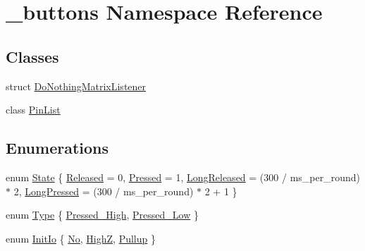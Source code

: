 \hypertarget{namespace__buttons}{}\section{\+\_\+buttons Namespace Reference}
\label{namespace__buttons}
\subsection*{Classes}
\begin{DoxyCompactItemize}
\item 
struct \hyperlink{struct__buttons_1_1DoNothingMatrixListener}{Do\+Nothing\+Matrix\+Listener}
\item 
class \hyperlink{class__buttons_1_1PinList}{Pin\+List}
\end{DoxyCompactItemize}
\subsection*{Enumerations}
\begin{DoxyCompactItemize}
\item 
enum \hyperlink{namespace__buttons_ae0bcacc9ee73b99889cf151d77ae2b8f}{State} \{ \newline
\hyperlink{namespace__buttons_ae0bcacc9ee73b99889cf151d77ae2b8faed054b3f25a72e25e4e57b728e7e945e}{Released} = 0, 
\newline
\hyperlink{namespace__buttons_ae0bcacc9ee73b99889cf151d77ae2b8fa8b62633a3dd6e8d1f8f2826500ca4246}{Pressed} = 1, 
\newline
\hyperlink{namespace__buttons_ae0bcacc9ee73b99889cf151d77ae2b8fa54cc1d73806cf15b92264c885ee0c058}{Long\+Released} = (300 / ms\+\_\+per\+\_\+round) $\ast$ 2, 
\newline
\hyperlink{namespace__buttons_ae0bcacc9ee73b99889cf151d77ae2b8fa485d442a59ca4545b46eaa1dfcd263dc}{Long\+Pressed} = (300 / ms\+\_\+per\+\_\+round) $\ast$ 2 + 1
 \}
\item 
enum \hyperlink{namespace__buttons_a36d15e3edce603f30900fff57fad10b2}{Type} \{ \newline
\hyperlink{namespace__buttons_a36d15e3edce603f30900fff57fad10b2a8282c2db9155da75abb5a4c372acb9e6}{Pressed\+\_\+\+High}, 
\newline
\hyperlink{namespace__buttons_a36d15e3edce603f30900fff57fad10b2a3532786b871c50168bb852cd29643393}{Pressed\+\_\+\+Low}
 \}
\item 
enum \hyperlink{namespace__buttons_ac0ca837263eab23747f0915e8d1e81ce}{Init\+Io} \{ \newline
\hyperlink{namespace__buttons_ac0ca837263eab23747f0915e8d1e81ceab1b30311f390f0d2eaef42effe3af7e2}{No}, 
\newline
\hyperlink{namespace__buttons_ac0ca837263eab23747f0915e8d1e81cea951cb7626dd8fdee82727b709a3529ae}{HighZ}, 
\newline
\hyperlink{namespace__buttons_ac0ca837263eab23747f0915e8d1e81cea30ab6bfc88d6c78893ecf3a3bacc2d53}{Pullup}
 \}
\end{DoxyCompactItemize}
